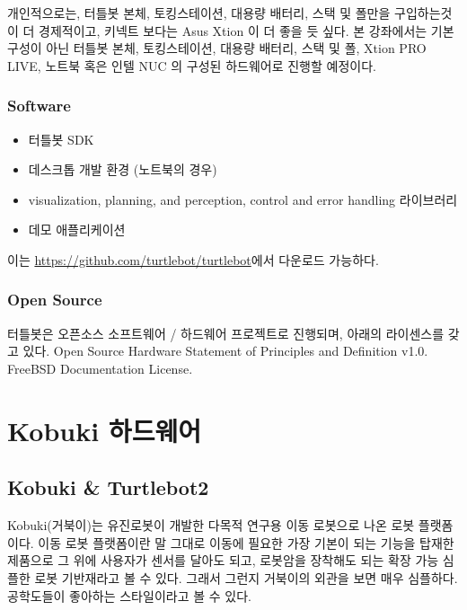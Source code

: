 \noindent
개인적으로는, 터틀봇 본체, 토킹스테이션, 대용량 배터리, 스택 및 폴만을 구입하는것이 더 경제적이고, 키넥트 보다는 Asus Xtion 이 더 좋을 듯 싶다. 본 강좌에서는 기본 구성이 아닌 터틀봇 본체, 토킹스테이션, 대용량 배터리, 스택 및 폴, Xtion PRO LIVE, 노트북 혹은 인텔 NUC 의 구성된 하드웨어로 진행할 예정이다.

\subsubsection{Software}

\begin{itemize}[leftmargin=*]
\item 터틀봇 SDK
\item 데스크톱 개발 환경 (노트북의 경우)
\item visualization, planning, and perception, control and error handling 라이브러리
\item 데모 애플리케이션
\end{itemize}

이는 \url{https://github.com/turtlebot/turtlebot}에서 다운로드 가능하다.


\subsubsection{Open Source}
터틀봇은 오픈소스 소프트웨어 / 하드웨어 프로젝트로 진행되며, 아래의 라이센스를 갖고 있다.
Open Source Hardware Statement of Principles and Definition v1.0. 
FreeBSD Documentation License.

\section{Kobuki 하드웨어}
\label{sec:KobukiHardware}

\subsection{Kobuki \& Turtlebot2}

Kobuki(거북이)는 유진로봇이 개발한 다목적 연구용 이동 로봇으로 나온 로봇 플랫폼이다. 이동 로봇 플랫폼이란 말 그대로 이동에 필요한 가장 기본이 되는 기능을 탑재한 제품으로 그 위에 사용자가 센서를 달아도 되고, 로봇암을 장착해도 되는 확장 가능 심플한 로봇 기반재라고 볼 수 있다. 그래서 그런지 거북이의 외관을 보면 매우 심플하다. 공학도들이 좋아하는 스타일이라고 볼 수 있다. 


